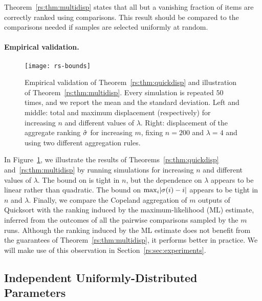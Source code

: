 Theorem~\ref{rs:thm:multidisp} states that all but a vanishing fraction of items are correctly ranked using  comparisons.
This result should be compared to the  comparisons needed if samples are selected uniformly at random.

\paragraph{Empirical validation.}

\begin{figure*}[t]
\centering
\texttt{[image: rs-bounds]}
\caption{
Empirical validation of Theorem~\ref{rs:thm:quickdisp} and illustration of Theorem~\ref{rs:thm:multidisp}.
Every simulation is repeated $50$ times, and we report the mean and the standard deviation.
Left and middle: total and maximum displacement (respectively) for increasing $n$ and different values of $\lambda$.
Right: displacement of the aggregate ranking $\hat{\sigma}$ for increasing $m$, fixing $n = \num{200}$ and $\lambda = \num{4}$ and using two different aggregation rules.
}
\label{rs:fig:bounds}
\end{figure*}

In Figure~\ref{rs:fig:bounds}, we illustrate the results of Theorems~\ref{rs:thm:quickdisp} and~\ref{rs:thm:multidisp} by running simulations for increasing $n$ and different values of $\lambda$.
The bound on \Disp{\sigma} is tight in $n$, but the dependence on $\lambda$ appears to be linear rather than quadratic.
The bound on $\max_i \lvert \sigma(i) - i \rvert$ appears to be tight in $n$ and $\lambda$.
Finally, we compare the Copeland aggregation of $m$ outputs of Quicksort with the ranking induced by the maximum-likelihood (ML) estimate, inferred from the outcomes of all the pairwise comparisons sampled by the $m$ runs.
Although the ranking induced by the ML estimate does not benefit from the guarantees of Theorem~\ref{rs:thm:multidisp}, it performs better in practice.
We will make use of this observation in Section~\ref{rs:sec:experiments}.


\subsection{Independent Uniformly-Distributed Parameters}
\label{rs:sec:iidunif}

